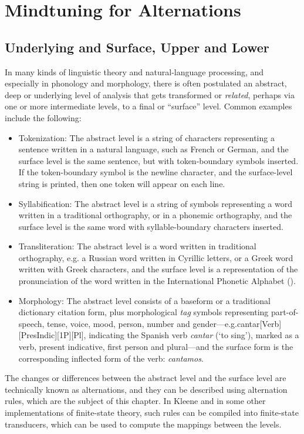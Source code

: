 \section{Mindtuning for Alternations}

\subsection{Underlying and Surface, Upper and Lower}

In many kinds of linguistic theory and natural-language processing, and especially in phonology and morphology, there
is often postulated an abstract, deep or underlying level of analysis that gets transformed or \emph{related}, perhaps
via one or more intermediate levels, to a final or ``surface'' level.   Common examples include the following:

\begin{itemize}
\item
Tokenization:  The abstract level is a string of characters representing a 
sentence written in a natural language,
such as French or German, and the surface level is
the same sentence, but with token-boundary symbols inserted.  If the token-boundary symbol is the
newline character, and the surface-level string is printed, then one token will appear on each line.
\item
Syllabification:  The abstract level is a string of symbols representing a
word written in a traditional orthography, or in a phonemic orthography, and the
surface level is the same word with syllable-boundary characters inserted.
\item
Transliteration:  The abstract level is a word written in traditional orthography, e.g.\@
a Russian word written in
Cyrillic letters, or a Greek word written with Greek characters, 
and the surface level is a representation of
the pronunciation of the word written in the International Phonetic Alphabet ().
\item
Morphology:  The abstract level consists of a baseform or a traditional
dictionary citation form, plus
morphological \emph{tag} symbols representing part-of-speech, tense, voice,
mood, person, number and gender---e.g.\@ cantar[Verb][PresIndic][1P][Pl], indicating the
Spanish verb \emph{cantar} (`to sing'), marked as a verb, present
indicative, first person and plural---and the surface form is the
corresponding inflected form of the verb: \emph{cantamos}.
\end{itemize}

\noindent
The changes or differences between the abstract level and the surface level are
technically known as alternations, and they can be described using alternation rules, which are the
subject of this chapter.  In
Kleene and in some other implementations of finite-state theory, 
such rules can be compiled into finite-state transducers, which can be
used to compute the mappings between the levels.

